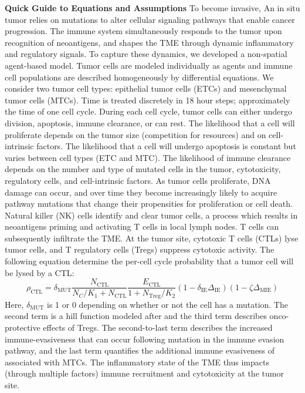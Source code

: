 \documentclass[11pt]{article}
\begin{document}
\begin{framed}
    {\bf Quick Guide to Equations and Assumptions}
    \newline
    To become invasive, An in situ tumor relies on mutations to alter cellular signaling pathways that enable cancer progression. The immune system simultaneously responds to the tumor upon recognition of neoantigens, and shapes the TME through dynamic inflammatory and regulatory signals.
\newline
To capture these dynamics, we developed a non-spatial agent-based model. Tumor cells are modeled individually as agents and immune cell populations are described homogeneously by differential equations. We consider two tumor cell types: epithelial tumor cells (ETCs) and mesenchymal tumor cells (MTCs). Time is treated discretely in 18 hour steps; approximately the time of one cell cycle. During each cell cycle, tumor cells can either undergo division, apoptosis, immune clearance, or can rest. The likelihood that a cell will proliferate depends on the tumor size (competition for resources) and on cell-intrinsic factors. The likelihood that a cell will undergo apoptosis is constant but varies between cell types (ETC and MTC). The likelihood of immune clearance depends on the number and type of mutated cells in the tumor, cytotoxicity, regulatory cells, and cell-intrinsic factors.
\newline
As tumor cells proliferate, DNA damage can occur, and over time they become increasingly likely to acquire pathway mutations that change their propensities for proliferation or cell death. Natural killer (NK) cells identify and clear tumor cells, a process which results in neoantigens  priming and activating T cells in local lymph nodes. T cells can subsequently infiltrate the TME. At the tumor site, cytotoxic T cells (CTLs) lyse tumor cells, and T regulatory cells (Tregs) suppress cytotoxic activity. The following equation determine the per-cell cycle probability that a tumor cell will be lysed by a CTL:
    $$\rho_{\text{CTL}} =\delta_{\text{MUT}} \frac{N_{\text{CTL}}}{N_C/K_{1}+N_{\text{CTL}}}  \frac{E_{\text{CTL}}}{1+N_{\text{Treg}}/K_2} (1-\delta_{\text{IE}}\Delta_{\text{IE}})(1-\zeta \Delta_{\text{MIE}})$$
    Here, $\delta_\text{MUT}$ is 1 or 0 depending on whether or not the cell has a mutation. The second term is a hill function modeled after \cite{de2014modeling} and the third term describes onco-protective effects of Tregs. The second-to-last term describes the increased immune-evasiveness that can occur following mutation in the immune evasion pathway, and the last term quantifies the additional immune evasiveness of associated with MTCs. The inflammatory state of the TME thus impacts (through multiple factors) immune recruitment and cytotoxicity at the tumor site.

\end{framed}
\end{document}

